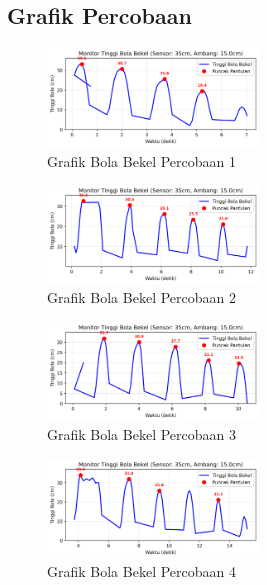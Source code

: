 \subsection{Grafik Percobaan}
\begin{figure}[htbp]
    \centering
    \includegraphics[width=0.5\textwidth]{chapters/DataPercobaan/Grafik_Bola_Bekel_1.png}
    \caption{Grafik Bola Bekel Percobaan 1}
\end{figure}
\begin{figure}[htbp]
    \centering
    \includegraphics[width=0.5\textwidth]{chapters/DataPercobaan/Grafik_Bola_Bekel_2.png}
    \caption{Grafik Bola Bekel Percobaan 2}
\end{figure}
\begin{figure}[htbp]
    \centering
    \includegraphics[width=0.5\textwidth]{chapters/DataPercobaan/Grafik_Bola_Bekel_3.png}
    \caption{Grafik Bola Bekel Percobaan 3}
\end{figure}
\begin{figure}[htbp]
    \centering
    \includegraphics[width=0.5\textwidth]{chapters/DataPercobaan/Grafik_Bola_Bekel_4.png}
    \caption{Grafik Bola Bekel Percobaan 4}
\end{figure}
